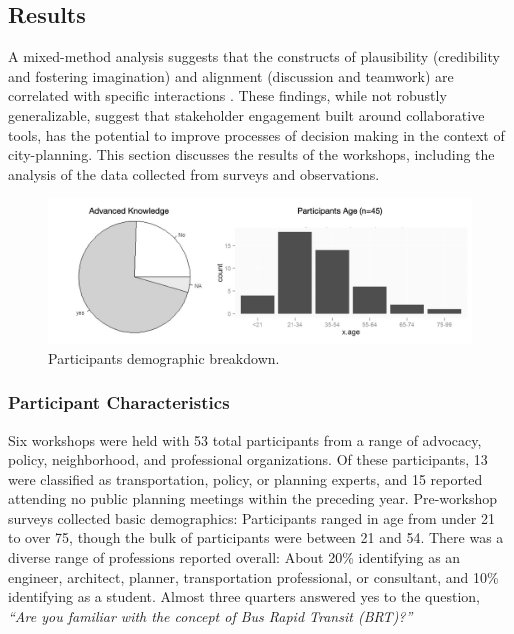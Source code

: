 {    \subsection{Results}
    {
        A mixed-method analysis suggests that the constructs of plausibility (credibility and fostering imagination) and alignment (discussion and teamwork) are correlated with specific interactions \cite{Alrashed2015}. These findings, while not robustly generalizable, suggest that stakeholder engagement built around collaborative tools, has the potential to improve processes of decision making in the context of city-planning. This section discusses the results of the workshops, including the analysis of the data collected from surveys and observations.


        \begin{figure}[!htb]
            \begin{center}
                \includegraphics[width=1\textwidth]{chapters/consensus/BRT/figures/brt9.jpeg}
            \end{center}
            \caption{Participants demographic breakdown.}
            \label{fig:brt_demographics}
        \end{figure}

        \subsubsection{Participant Characteristics}
        {
            Six workshops were held with 53 total participants from a range of advocacy, policy, neighborhood, and professional organizations. Of these participants, 13 were classified as transportation, policy, or planning experts, and 15 reported attending no public planning meetings within the preceding year. Pre-workshop surveys collected basic demographics: Participants ranged in age from under 21 to over 75, though the bulk of participants were between 21 and 54. There was a diverse range of professions reported overall: About 20\% identifying as an engineer, architect, planner, transportation professional, or consultant, and 10\% identifying as a student. Almost three quarters answered yes to the question, \textit{``Are you familiar with the concept of Bus Rapid Transit (BRT)?''}
        }

}}
